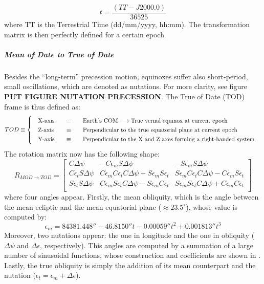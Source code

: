 		\[
		t 	= \dfrac{\left(TT - J2000.0\right)}{36525}		
		\]
		\noindent where TT is the Terrestrial Time (dd/mm/yyyy, hh:mm). The transformation matrix is then perfectly defined for a certain epoch
		\subparagraph{Mean of Date to True of Date \\}
		\indent Besides the ``long-term'' precession motion, equinoxes suffer also short-period, small oscillations, which are denoted as nutations. For more clarity, see figure \textbf{PUT FIGURE NUTATION PRECESSION}. The True of Date (TOD) frame is thus defined as: \\
		\[
		\arraycolsep=10pt
		\def\arraystretch{1.3}
		TOD\equiv\left\{
		\begin{array}{lll}
		\text{X-axis} 	& \equiv 	& \text{Earth's COM} \longrightarrow \text{True vernal equinox at current epoch} \\
		\text{Z-axis} 	& \equiv 	& \text{Perpendicular to the true equatorial plane at current epoch} \\
		\text{Y-axis} 	& \equiv 	& \text{Perpendicular to the X and Z axes forming a right-handed system} \\
		\end{array}
		\right.
		\]
		\indent The rotation matrix now has the following shape:
		\begin{equation}
		R_{MOD\rightarrow TOD} = 
		\left[ 
		\begin{array}{lll}
		C \Delta \psi 				& - C \epsilon_m S \Delta \psi 	& - S \epsilon_m S \Delta \psi \\
		C \epsilon_t S \Delta \psi 	& C \epsilon_m C \epsilon_t C \Delta \psi + S \epsilon_m S \epsilon_t & S \epsilon_m C \epsilon_t C \Delta \psi - C \epsilon_m S \epsilon_t \\
		S \epsilon_t S \Delta \psi 	& C \epsilon_m S \epsilon_t C \Delta \psi - S \epsilon_m C \epsilon_t & S \epsilon_m S \epsilon_t C \Delta \psi + C \epsilon_m C \epsilon_t \\
		\end{array}
		\right]
		\label{eq: R_MOD_TOD}
		\end{equation}
		\noindent where four angles appear. Firstly, the mean obliquity, which is the angle between the mean ecliptic and the mean equatorial plane ($\approx 23.5^{\circ}$), whose value is computed by:
		\[
		\epsilon_m = 84381.448'' - 46.8150''t - 0.00059'' t^2 + 0.001813'' t^3		
		\]
		\indent Moreover, two nutations appear: the one in longitude and the one in obliquity ($\Delta \psi$ and $\Delta \epsilon$, respectively). This angles are computed by a summation of a large number of sinusoidal functions, whose construction and coefficients are shown in \cite{IERS_conventions}. Lastly, the true obliquity is simply the addition of its mean counterpart and the nutation ($\epsilon_t = \epsilon_m + \Delta \epsilon$).
